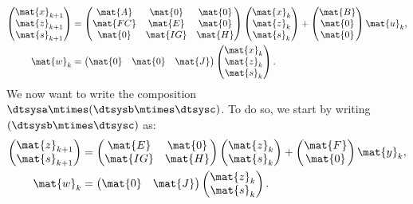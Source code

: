 \begin{equation*}
	\label{eq:dlin-5}
	\begin{aligned}
		\begin{pmatrix}
			\mat{x}_{k+1} \\
			\mat{z}_{k+1} \\
			\mat{s}_{k+1}
		\end{pmatrix} & =
		\begin{pmatrix}
			\mat{A}  & \mat{0}  & \mat{0} \\
			\mat{FC} & \mat{E}  & \mat{0} \\
			\mat{0}  & \mat{IG} & \mat{H}
		\end{pmatrix}
		\begin{pmatrix}
			\mat{x}_k \\ \mat{z}_k\\ \mat{s}_k
		\end{pmatrix}+
		\begin{pmatrix}
			\mat{B} \\ \mat{0}\\ \mat{0}
		\end{pmatrix}\mat{u}_k, \\
		\mat{w}_k                  & =
		\begin{pmatrix}
			\mat{0} & \mat{0} & \mat{J}
		\end{pmatrix}
		\begin{pmatrix}
			\mat{x}_k \\ \mat{z}_k\\ \mat{s}_k
		\end{pmatrix}.
	\end{aligned}
\end{equation*}
We now want to write the composition~$\dtsysa\mtimes (\dtsysb\mtimes \dtsysc)$.
To do so, we start by writing~$(\dtsysb\mtimes \dtsysc)$ as:
\begin{equation*}
	\label{eq:dlin-6}
	\begin{aligned}
		\begin{pmatrix}
			\mat{z}_{k+1} \\
			\mat{s}_{k+1}
		\end{pmatrix} & =
		\begin{pmatrix}
			\mat{E}  & \mat{0} \\
			\mat{IG} & \mat{H}
		\end{pmatrix}
		\begin{pmatrix}
			\mat{z}_k \\ \mat{s}_k
		\end{pmatrix}+
		\begin{pmatrix}
			\mat{F} \\ \mat{0}
		\end{pmatrix}\mat{y}_k, \\
		\mat{w}_k                  & =
		\begin{pmatrix}
			\mat{0} & \mat{J}
		\end{pmatrix}
		\begin{pmatrix}
			\mat{z}_k \\ \mat{s}_k
		\end{pmatrix}.
	\end{aligned}
\end{equation*}
